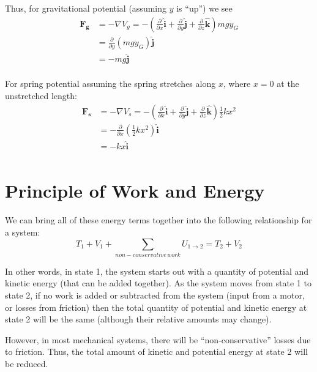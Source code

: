 \documentclass[12pt,letterpaper,twoside]{report}
\begin{document}
Thus, for gravitational potential (assuming $y$  is “up”) we see
\begin{align*}
\displaystyle \bm{F_g} &= - \nabla V_g = - \left( \frac{\partial}{\partial x} \bm{\hat{i}} + \frac{\partial}{\partial y} \bm{\hat{j}} + \frac{\partial}{\partial z} \bm{\hat{k}} \right) mgy_G\\
&= \frac{\partial}{\partial y} (mgy_G) \bm{\hat{j}}\\
&=-mg \bm{\hat{j}}\\
\end{align*}

For spring potential assuming the spring stretches along $x$, where $x=0$ at the unstretched length:
\begin{align*}
\displaystyle \bm{F_s} &= - \nabla V_s = - \left( \frac{\partial}{\partial x} \bm{\hat{i}} + \frac{\partial}{\partial y} \bm{\hat{j}} + \frac{\partial}{\partial z} \bm{\hat{k}} \right) \frac{1}{2} k x^2\\
&= - \frac{\partial}{\partial x} \left( \frac{1}{2} k x^2 \right) \bm{\hat{i}}\\
&=-kx \bm{\hat{i}}\\
\end{align*}

\section{Principle of Work and Energy}
We can bring all of these energy terms together into the following relationship for a system: 
\[
T_1 + V_1 + \sum_{non-conservative \,work}U_{1 \rightarrow 2} = T_2 + V_2
\]

\vspace*{2\baselineskip}
In other words, in state 1, the system starts out with a quantity of potential and kinetic energy (that can be added together).  As the system moves from state 1 to state 2, if no work is added or subtracted from the system (input from a motor, or losses from friction) then the total quantity of potential and kinetic energy at state 2 will be the same (although their relative amounts may change).  

However, in most mechanical systems, there will be “non-conservative” losses due to friction.  Thus, the total amount of kinetic and potential energy at state 2 will be reduced.  

\vspace*{16\baselineskip}
\end{document}
